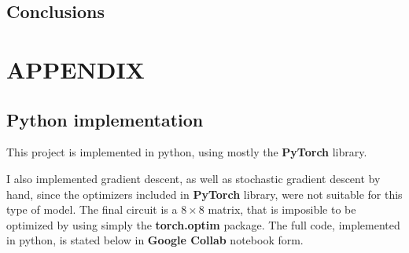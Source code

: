 \documentclass[inscr,ack,preface]{diphdthesis}
\begin{document}
\section{Conclusions}

\chapter{APPENDIX}
\section{Python implementation}

This project is implemented in python, using mostly the \textbf{PyTorch} library. 

I also implemented gradient descent, as well as stochastic gradient descent by hand, since the optimizers included in \textbf{PyTorch} library, were not suitable for this type of model. The final circuit is a $8\times8$ matrix, that is imposible to be optimized by using simply the \textbf{torch.optim} package. The full code, implemented in python, is stated below in \textbf{Google Collab} notebook form. \\





\end{document}

